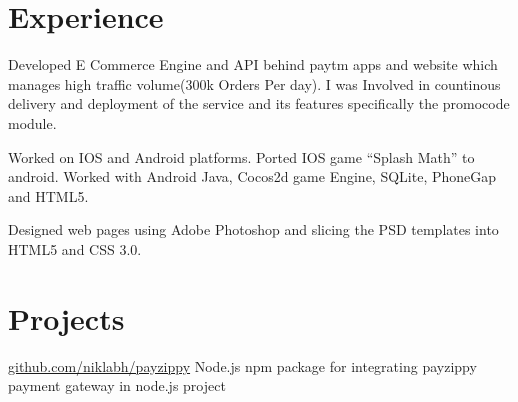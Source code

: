 \documentclass[]{deedy-resume-openfont}
\begin{document}
\hfill
\begin{minipage}[t]{0.66\textwidth} 


\section{Experience}

\vspace{\topsep} %
\begin{tightemize}
\item Developed E Commerce Engine and API behind paytm apps and website which manages high traffic volume(300k Orders Per day). I was Involved in countinous delivery and deployment of the service and its features specifically the promocode module.
\end{tightemize}
\sectionsep

\begin{tightemize}
\item Worked on IOS and Android platforms. Ported IOS game “Splash Math” to android. Worked with Android Java, Cocos2d game Engine, SQLite, PhoneGap and HTML5.
\end{tightemize}
\sectionsep

\begin{tightemize}
\item Designed web pages using Adobe Photoshop and slicing the PSD templates into HTML5 and CSS 3.0.
\end{tightemize}
\sectionsep


\section{Projects}

\href{https://github.com/niklabh/payzippy}{github.com/niklabh/payzippy}
Node.js npm package for integrating payzippy payment gateway in node.js project
\sectionsep


\end{minipage}
\end{document}
